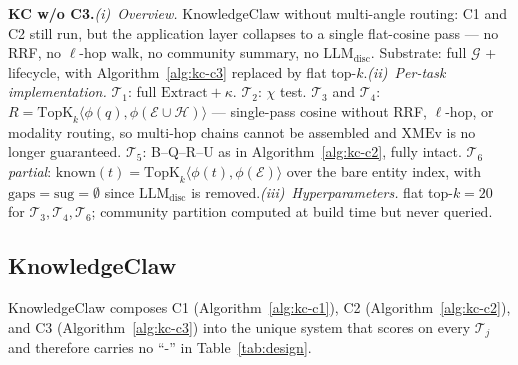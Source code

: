 \documentclass{article}
\begin{document}
\noindent\textbf{KC w/o C3.}\quad\emph{(i)~Overview.} KnowledgeClaw without multi-angle routing: C1 and C2 still run, but the application layer collapses to a single flat-cosine pass --- no RRF, no $\ell$-hop walk, no community summary, no $\mathrm{LLM}_{\mathrm{disc}}$. Substrate: full $\mathcal{G}$ + lifecycle, with Algorithm~\ref{alg:kc-c3} replaced by flat top-$k$.\quad\emph{(ii)~Per-task implementation.} $\mathcal{T}_1$: full $\mathrm{Extract}\!+\!\kappa$. $\mathcal{T}_2$: $\chi$ test. $\mathcal{T}_3$ and $\mathcal{T}_4$: $R\!=\!\mathrm{TopK}_{k}\!\langle\phi(q),\phi(\mathcal{E}\!\cup\!\mathcal{H})\rangle$ --- single-pass cosine without RRF, $\ell$-hop, or modality routing, so multi-hop chains cannot be assembled and $\mathrm{XMEv}$ is no longer guaranteed. $\mathcal{T}_5$: B--Q--R--U as in Algorithm~\ref{alg:kc-c2}, fully intact. $\mathcal{T}_6$ \emph{partial}: $\mathrm{known}(t)\!=\!\mathrm{TopK}_{k}\!\langle\phi(t),\phi(\mathcal{E})\rangle$ over the bare entity index, with $\mathrm{gaps}\!=\!\mathrm{sug}\!=\!\emptyset$ since $\mathrm{LLM}_{\mathrm{disc}}$ is removed.\quad\emph{(iii)~Hyperparameters.} flat top-$k\!=\!20$ for $\mathcal{T}_3,\mathcal{T}_4,\mathcal{T}_6$; community partition computed at build time but never queried.

\subsection{KnowledgeClaw}\label{app:b-kc}

KnowledgeClaw composes C1 (Algorithm~\ref{alg:kc-c1}), C2 (Algorithm~\ref{alg:kc-c2}), and C3 (Algorithm~\ref{alg:kc-c3}) into the unique system that scores on every $\mathcal{T}_j$ and therefore carries no ``-'' in Table~\ref{tab:design}.
\end{document}
